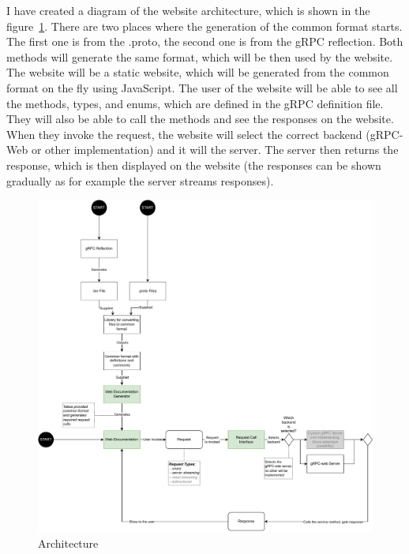 I have created a diagram of the website architecture, which is shown in the figure~\ref{fig:grpcflair-architecture}.
There are two places where the generation of the common format starts.
The first one is from the .proto, the second one is from the gRPC reflection.
Both methods will generate the same format, which will be then used by the website.
The website will be a static website, which will be generated from the common format on the fly using JavaScript.
The user of the website will be able to see all the methods, types, and enums, which are defined in the gRPC definition file.
They will also be able to call the methods and see the responses on the website.
When they invoke the request, the website will select the correct backend (gRPC-Web or other implementation) and it will the server.
The server then returns the response, which is then displayed on the website (the responses can be shown gradually as for example the server streams responses).


\begin{figure}[hbt!]
    \centering
    \captionsetup{justification=centering}
    \includegraphics[width=1.0\textwidth]{images/design/grpcdoc-architecture}
    \caption{Architecture}
    \label{fig:grpcflair-architecture}
\end{figure}


